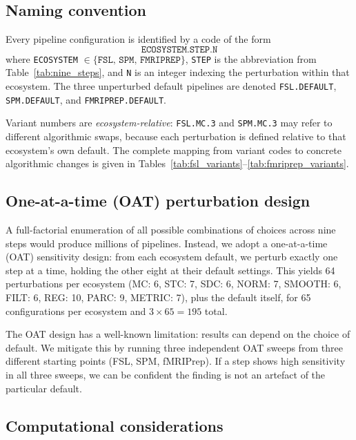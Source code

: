 \documentclass[11pt,a4paper]{article}
\begin{document}
\subsection{Naming convention}
\label{sec:naming}

Every pipeline configuration is identified by a code of the form
\[
    \texttt{ECOSYSTEM.STEP.N}
\]
where \texttt{ECOSYSTEM} $\in \{\texttt{FSL},\, \texttt{SPM},\, \texttt{FMRIPREP}\}$, \texttt{STEP} is the abbreviation from Table~\ref{tab:nine_steps}, and \texttt{N} is an integer indexing the perturbation within that ecosystem.  The three unperturbed default pipelines are denoted \texttt{FSL.DEFAULT}, \texttt{SPM.DEFAULT}, and \texttt{FMRIPREP.DEFAULT}.

Variant numbers are \emph{ecosystem-relative}: \texttt{FSL.MC.3} and \texttt{SPM.MC.3} may refer to different algorithmic swaps, because each perturbation is defined relative to that ecosystem's own default.  The complete mapping from variant codes to concrete algorithmic changes is given in Tables~\ref{tab:fsl_variants}--\ref{tab:fmriprep_variants}.

\subsection{One-at-a-time (OAT) perturbation design}
\label{sec:oat}

A full-factorial enumeration of all possible combinations of choices across nine steps would produce millions of pipelines.  Instead, we adopt a one-at-a-time (OAT) sensitivity design: from each ecosystem default, we perturb exactly one step at a time, holding the other eight at their default settings.  This yields 64 perturbations per ecosystem (MC: 6, STC: 7, SDC: 6, NORM: 7, SMOOTH: 6, FILT: 6, REG: 10, PARC: 9, METRIC: 7), plus the default itself, for 65 configurations per ecosystem and $3 \times 65 = 195$ total.

The OAT design has a well-known limitation: results can depend on the choice of default.  We mitigate this by running three independent OAT sweeps from three different starting points (FSL, SPM, fMRIPrep).  If a step shows high sensitivity in all three sweeps, we can be confident the finding is not an artefact of the particular default.

\subsection{Computational considerations}
\end{document}
